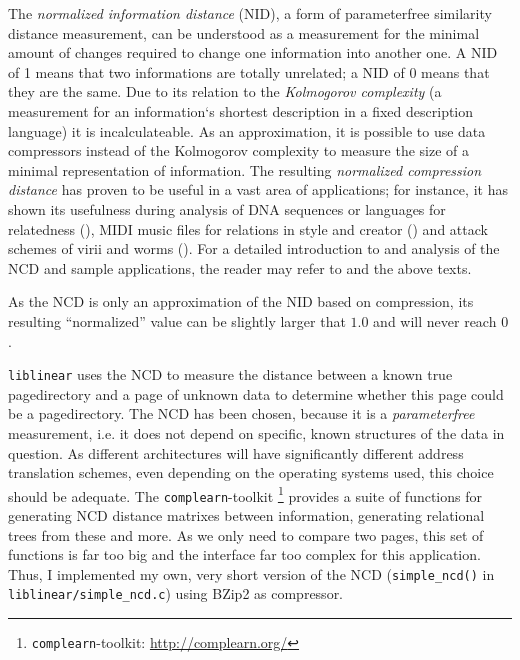 \label{ATTstatistics} The \emph{normalized information distance} (NID), a form
of parameterfree similarity distance measurement, can be understood as a
measurement for the minimal amount of changes required to change one information
into another one.  A NID of 1 means that two informations are totally unrelated;
a NID of 0 means that they are the same.  Due to its relation to the
\emph{Kolmogorov complexity} (a measurement for an information`s shortest
description in a fixed description language) it is incalculateable.  As an
approximation, it is possible to use data compressors instead of the Kolmogorov
complexity to measure the size of a minimal representation of information. The
resulting \emph{normalized compression distance} has proven to be useful in a
vast area of applications; for instance, it has shown its usefulness during
analysis of DNA sequences or languages for relatedness
(\cite{clustering_by_compression:2005,similarity_matrix:2004}), MIDI music files
for relations in style and creator (\cite{clustering_by_compression:2005}) and
attack schemes of virii and worms (\cite{analysing_worms_with_ncd:2006}).  For a
detailed introduction to and analysis of the NCD and sample applications, the
reader may refer to \cite{kolmogorov:1997} and the above texts.

As the NCD is only an approximation of the NID based on compression, its
resulting ``normalized'' value can be slightly larger that $1.0$ and will never
reach $0$.

\texttt{liblinear} uses the NCD to measure the distance between a known true
pagedirectory and a page of unknown data to determine whether this page could be
a pagedirectory. The NCD has been chosen, because it is a \emph{parameterfree}
measurement, i.e. it does not depend on specific, known structures of the data
in question. As different architectures will have significantly different
address translation schemes, even depending on the operating systems used, this
choice should be adequate. The \texttt{complearn}-toolkit
\footnote{\texttt{complearn}-toolkit:
\href{http://complearn.org/}{http://complearn.org/}} provides a suite of
functions for generating NCD distance matrixes between information, generating
relational trees from these and more.  As we only need to compare two pages,
this set of functions is far too big and the interface far too complex for this
application.  Thus, I implemented my own, very short version of the NCD
(\texttt{simple\_ncd()} in \texttt{liblinear/simple\_ncd.c}) using BZip2 as
compressor.

